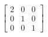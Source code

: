 \documentclass[preview]{standalone}
\begin{document}
\begin{align*}
\begin{bmatrix} 2 & 0 & 0 \\ 0 & 1 & 0 \\ 0 & 0 & 1\end{bmatrix}
\end{align*}
\end{document}
